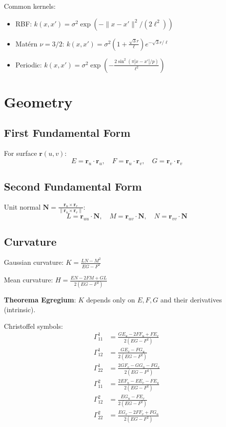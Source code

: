 Common kernels:
\begin{itemize}
    \item RBF: $k(x,x') = \sigma^2 \exp(-\|x-x'\|^2/(2\ell^2))$
    \item Matérn $\nu=3/2$: $k(x,x') = \sigma^2 (1 + \frac{\sqrt{3}r}{\ell}) e^{-\sqrt{3}r/\ell}$
    \item Periodic: $k(x,x') = \sigma^2 \exp(-\frac{2\sin^2(\pi|x-x'|/p)}{\ell^2})$
\end{itemize}

\section{Geometry}

\subsection{First Fundamental Form}

For surface $\mathbf{r}(u,v)$:
\[
E = \mathbf{r}_u \cdot \mathbf{r}_u, \quad
F = \mathbf{r}_u \cdot \mathbf{r}_v, \quad
G = \mathbf{r}_v \cdot \mathbf{r}_v
\]

\subsection{Second Fundamental Form}

Unit normal $\mathbf{N} = \frac{\mathbf{r}_u \times \mathbf{r}_v}{\|\mathbf{r}_u \times \mathbf{r}_v\|}$:
\[
L = \mathbf{r}_{uu} \cdot \mathbf{N}, \quad
M = \mathbf{r}_{uv} \cdot \mathbf{N}, \quad
N = \mathbf{r}_{vv} \cdot \mathbf{N}
\]

\subsection{Curvature}

Gaussian curvature: $K = \frac{LN - M^2}{EG - F^2}$

Mean curvature: $H = \frac{EN - 2FM + GL}{2(EG - F^2)}$

\textbf{Theorema Egregium}: $K$ depends only on $E, F, G$ and their derivatives (intrinsic).

Christoffel symbols:
\begin{align*}
\Gamma_{11}^1 &= \frac{GE_u - 2FF_u + FE_v}{2(EG-F^2)} \\
\Gamma_{12}^1 &= \frac{GE_v - FG_u}{2(EG-F^2)} \\
\Gamma_{22}^1 &= \frac{2GF_v - GG_u - FG_v}{2(EG-F^2)} \\
\Gamma_{11}^2 &= \frac{2EF_u - EE_v - FE_u}{2(EG-F^2)} \\
\Gamma_{12}^2 &= \frac{EG_u - FE_v}{2(EG-F^2)} \\
\Gamma_{22}^2 &= \frac{EG_v - 2FF_v + FG_u}{2(EG-F^2)}
\end{align*}

